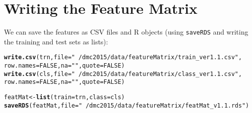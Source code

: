 \documentclass[10pt]{report}
\makeatletter
\newcommand{\hlnum}[1]{\textcolor[rgb]{0.686,0.059,0.569}{#1}}%
\newcommand{\hlstr}[1]{\textcolor[rgb]{0.192,0.494,0.8}{#1}}%
\newcommand{\hlstd}[1]{\textcolor[rgb]{0.345,0.345,0.345}{#1}}%
\newcommand{\hlkwb}[1]{\textcolor[rgb]{0.69,0.353,0.396}{#1}}%
\newcommand{\hlkwc}[1]{\textcolor[rgb]{0.333,0.667,0.333}{#1}}%
\newcommand{\hlkwd}[1]{\textcolor[rgb]{0.737,0.353,0.396}{\textbf{#1}}}%
\newenvironment{kframe}{%
 \def\at@end@of@kframe{}%
 \ifinner\ifhmode%
  \def\at@end@of@kframe{\end{minipage}}%
  \begin{minipage}{\columnwidth}%
 \fi\fi%
 \def\FrameCommand##1{\hskip\@totalleftmargin \hskip-\fboxsep
 \colorbox{shadecolor}{##1}\hskip-\fboxsep
     \hskip-\linewidth \hskip-\@totalleftmargin \hskip\columnwidth}%
 \MakeFramed {\advance\hsize-\width
   \@totalleftmargin\z@ \linewidth\hsize
   \@setminipage}}%
 {\par\unskip\endMakeFramed%
 \at@end@of@kframe}
\newenvironment{knitrout}{}{} %
\makeatother
\begin{document}
\section{Writing the Feature Matrix}
We can save the features as CSV files and R objects (using \verb!saveRDS! and writing the training and test sets as lists):
\begin{knitrout}
\color{fgcolor}\begin{kframe}
\begin{alltt}
\hlkwd{write.csv}\hlstd{(trn,} \hlkwc{file} \hlstd{=} \hlstr{"~/dmc2015/data/featureMatrix/train_ver1.1.csv"}\hlstd{,}
    \hlkwc{row.names} \hlstd{=} \hlnum{FALSE}\hlstd{,} \hlkwc{na} \hlstd{=} \hlstr{""}\hlstd{,} \hlkwc{quote} \hlstd{=} \hlnum{FALSE}\hlstd{)}
\hlkwd{write.csv}\hlstd{(cls,} \hlkwc{file} \hlstd{=} \hlstr{"~/dmc2015/data/featureMatrix/class_ver1.1.csv"}\hlstd{,}
    \hlkwc{row.names} \hlstd{=} \hlnum{FALSE}\hlstd{,} \hlkwc{na} \hlstd{=} \hlstr{""}\hlstd{,} \hlkwc{quote} \hlstd{=} \hlnum{FALSE}\hlstd{)}

\hlstd{featMat} \hlkwb{<-} \hlkwd{list}\hlstd{(}\hlkwc{train} \hlstd{= trn,} \hlkwc{class} \hlstd{= cls)}
\hlkwd{saveRDS}\hlstd{(featMat,} \hlkwc{file} \hlstd{=} \hlstr{"~/dmc2015/data/featureMatrix/featMat_v1.1.rds"}\hlstd{)}
\end{alltt}
\end{kframe}
\end{knitrout}
\end{document}
